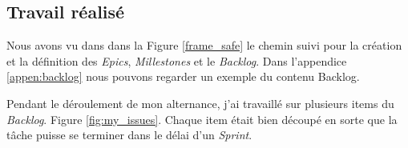 \subsection{Travail réalisé}
Nous avons vu dans dans la Figure \ref{frame_safe} le chemin suivi pour la création et la définition des \textit{Epics}, \textit{Millestones} et le \textit{Backlog}. Dans l'appendice \ref{appen:backlog} nous pouvons regarder un exemple du contenu Backlog.

Pendant le déroulement de mon alternance, j'ai travaillé sur plusieurs items du \textit{Backlog}. Figure \ref{fig:my_issues}. Chaque item était bien découpé en sorte que la tâche puisse se terminer dans le délai d'un \textit{Sprint}.
